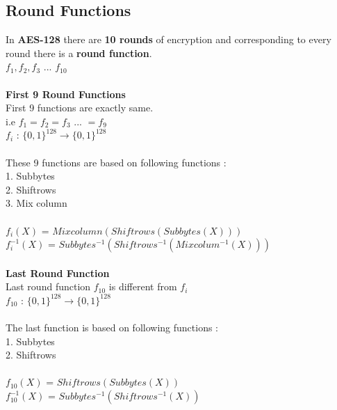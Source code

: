 \documentclass[11pt]{article}
\begin{document}
\subsection*{Round Functions}
In \textbf{AES-128} there are \textbf{10 rounds} of encryption and corresponding to every round there is a \textbf{round function}. \\ 
$f_{1},f_{2},f_{3}$ ... $f_{10}$ \\ 
\\
\textbf{First 9 Round Functions} \\
First 9 functions are exactly same. \\
i.e $f_{1} = f_{2} = f_{3}$ ... $ = f_{9}$ \\ 
$f_{i}$ : $\{0,1\}^{128} \rightarrow \{0,1\}^{128}$ \\
\\
These 9 functions are based on following functions : \\
1. Subbytes \\
2. Shiftrows \\
3. Mix column \\
\\
$f_{i}(X)$ = $Mixcolumn(Shiftrows(Subbytes(X)))$ \\
$f_{i}^{-1}(X)$ = $Subbytes^{-1}(Shiftrows^{-1}(Mixcolum^{-1}(X)))$\\
\\
\textbf{Last Round Function} \\
Last round function $f_{10}$ is different from $f_{i}$ \\
$f_{10}$ : $\{0,1\}^{128} \rightarrow \{0,1\}^{128}$ \\
\\
The last function is based on following functions : \\
1. Subbytes \\
2. Shiftrows \\
\\
$f_{10}(X)$ = $Shiftrows(Subbytes(X))$ \\
$f_{10}^{-1}(X)$ = $Subbytes^{-1}(Shiftrows^{-1}(X))$\\
\end{document}
